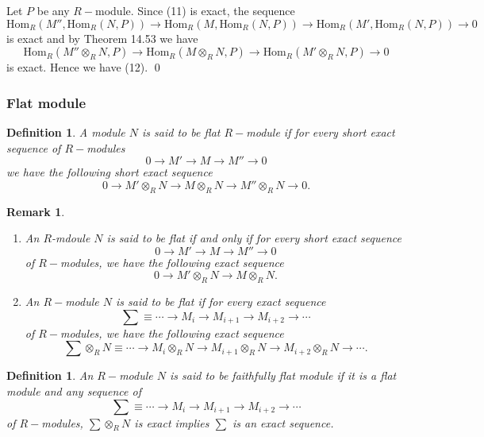 \documentclass[11pt]{amsart}
\newtheorem{defn}[theorem]{Definition}
\newtheorem{remark}[theorem]{Remark}%
\newcommand{\Hom}[1]{\text{Hom}_R\left(#1\right)}
\begin{document}
\proof Let $P$ be any $R-$module. Since (11) is exact, the sequence \begin{equation}
\Hom{M'',\Hom{N,P}}\to \Hom{M,\Hom{N,P}}\to \Hom{M',\Hom{N,P}}\to 0
\end{equation}
is exact and by Theorem 14.53 we have $$\Hom{M''\otimes_R N,P}\to \Hom{M\otimes_R N,P}\to \Hom{M'\otimes_R N,P}\to 0$$ is exact. Hence we have (12). \qed

\subsubsection{Flat module}

\begin{defn}

A module $N$ is said to be flat $R-$module if for every short exact sequence of $R-$modules $$0\to M'\to M\to M''\to 0$$ we have the following short exact sequence $$0\to M'\otimes_R N\to M\otimes_R N\to M''\otimes_R N\to 0.$$

\end{defn}

\begin{remark}
\begin{enumerate}

\item An $R$-mdoule $N$ is said to be flat if and only if for every short exact sequence $$0\to M'\to M\to M''\to 0$$ of $R-$modules, we have the following exact sequence $$0\to M'\otimes_R N\to M\otimes_R N.$$

\item An $R-$module $N$ is said to be flat if for every exact sequence $$\sum\equiv \cdots\to M_i\to M_{i+1}\to M_{i+2}\to\cdots$$ of $R-$modules, we have the following exact sequence $$\sum\otimes_R N\equiv \cdots\to M_i\otimes_R N\to M_{i+1}\otimes_R N\to M_{i+2}\otimes_R N\to\cdots.$$

\end{enumerate}

\end{remark}

\begin{defn}

An $R-$module $N$ is said to be faithfully flat module if it is a flat module and any sequence of $$\sum\equiv \cdots\to M_i\to M_{i+1}\to M_{i+2}\to\cdots$$ of $R-$modules, $\displaystyle\sum\otimes_R N$ is exact implies $\displaystyle\sum$ is an exact sequence.

\end{defn}
\end{document}
